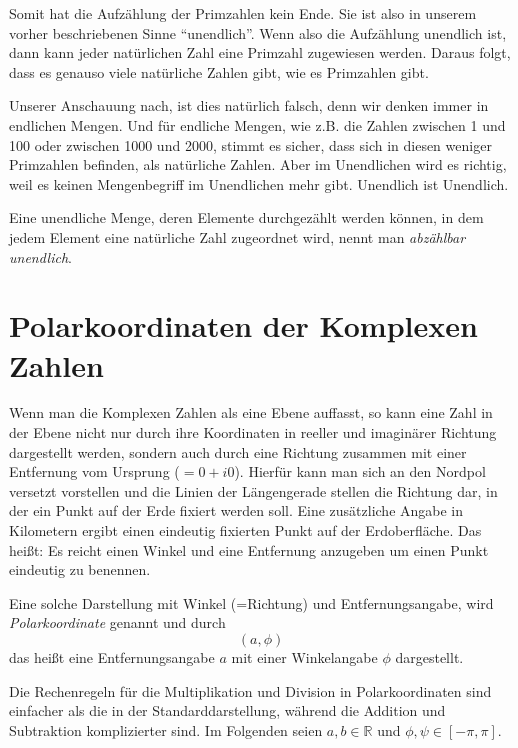 Somit hat die Aufzählung der Primzahlen kein Ende. Sie ist also in unserem vorher beschriebenen Sinne "`unendlich"'. Wenn also die Aufzählung unendlich ist, dann kann jeder natürlichen Zahl eine Primzahl zugewiesen werden. Daraus folgt, dass es genauso viele natürliche Zahlen gibt, wie es Primzahlen gibt. 

Unserer Anschauung nach, ist dies natürlich falsch, denn wir denken immer in endlichen Mengen. Und für endliche Mengen, wie z.B. die Zahlen zwischen 1 und 100 oder zwischen 1000 und 2000, stimmt es sicher, dass sich in diesen weniger Primzahlen befinden, als natürliche Zahlen. Aber im Unendlichen wird es richtig, weil es keinen Mengenbegriff im Unendlichen mehr gibt. Unendlich ist Unendlich.

\begin{definition}
Eine unendliche Menge, deren Elemente durchgezählt werden können, in dem jedem Element eine natürliche Zahl zugeordnet wird, nennt man \emph{abzählbar unendlich}.\label{abzaehlbar}  
\end{definition}

\section{Polarkoordinaten der Komplexen Zahlen}

Wenn man die Komplexen Zahlen als eine Ebene auffasst, so kann eine Zahl in der Ebene nicht nur durch ihre Koordinaten in reeller und imaginärer Richtung dargestellt werden, sondern auch durch eine Richtung zusammen mit einer Entfernung vom Ursprung ($=0+i0$). Hierfür kann man sich an den Nordpol versetzt vorstellen und die Linien der Längengerade stellen die Richtung dar, in der ein Punkt auf der Erde fixiert werden soll. Eine zusätzliche Angabe in Kilometern ergibt einen eindeutig fixierten Punkt auf der Erdoberfläche. Das heißt: Es reicht einen Winkel und eine Entfernung anzugeben um einen Punkt eindeutig zu benennen. 

\begin{definition}
Eine solche Darstellung mit Winkel (=Richtung) und Entfernungsangabe, wird \emph{Polarkoordinate} genannt und durch 
\[(a,\phi)\]
das heißt eine Entfernungsangabe $a$ mit einer Winkelangabe $\phi$ dargestellt.
\end{definition}

Die Rechenregeln für die Multiplikation und Division in Polarkoordinaten sind einfacher als die in der Standarddarstellung, während die Addition und Subtraktion komplizierter sind. Im Folgenden seien $a,b \in \mathbb{R}$ und $\phi,\psi \in \left[-\pi, \pi\right]$.

